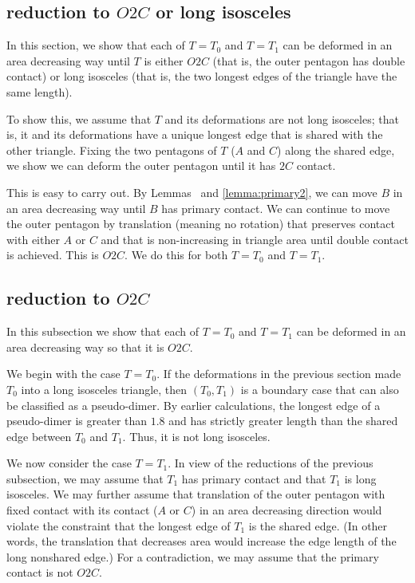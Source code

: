 \subsection{reduction to $O2C$ or long isosceles}



In this section, we show that each of $T=T_0$ and $T=T_1$ can be deformed in an area
decreasing way until $T$ is either $O2C$ (that is, the outer pentagon has double contact)
or long isosceles (that is, the two longest edges of the triangle have the same length).

To show this, we assume that $T$ and its deformations are not long isosceles;  that is,
it and its deformations have a unique longest edge that is shared with the other triangle.  Fixing the two pentagons of $T$
($A$ and $C$) along the shared edge, we show we can deform the outer pentagon until it has $2C$ contact.

This is easy to carry out.  By Lemmas~ and \ref{lemma:primary2}, we can move $B$ in an area decreasing way until $B$ has primary
contact.  We can continue to move the outer pentagon by translation (meaning no rotation) that preserves contact with either
$A$ or $C$ and that is non-increasing in triangle area until double contact is achieved.  This is $O2C$.
We do this for both $T=T_0$ and $T=T_1$.

\subsection{reduction to $O2C$}

In this subsection we show that each of $T=T_0$ and $T=T_1$ can be deformed in an area decreasing way
so that
it is $O2C$.  

We begin with the case $T=T_0$.  If the deformations in the previous section made $T_0$ into a long isosceles triangle,
then $(T_0,T_1)$ is a boundary case that  can also be classified as a pseudo-dimer.  By earlier calculations, the longest edge
of a pseudo-dimer is greater than $1.8$ and has strictly greater length than the shared edge between $T_0$ and $T_1$.
Thus, it is not long isosceles.

We now consider the case $T=T_1$.
In view of the reductions of the previous subsection, we may assume that $T_1$ has primary contact and
that $T_1$ is long isosceles.  We may further assume  that translation of the outer pentagon with fixed contact with its contact ($A$ or $C$)
in an area decreasing direction would violate the constraint that the longest edge of $T_1$ is the shared edge.  (In other words,
the translation that decreases area would increase the edge length of the long nonshared edge.)
For a contradiction, we may assume that the primary contact is not $O2C$.

